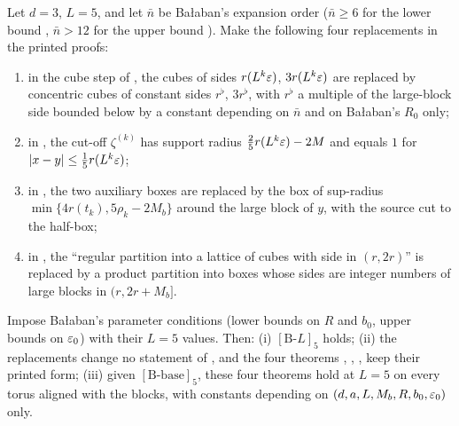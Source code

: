 \begin{theorem}\label{thm:a06:BALA}
Let $d=3$, $L=5$, and let $\bar n$ be Ba{\l}aban's expansion order ($\bar n\ge6$ for the lower bound \cite[p.~605]{Ba1}, $\bar n>12$ for the upper bound \cite[p.~563]{Ba2}). Make the following four replacements in the printed proofs:
\begin{enumerate}[label=\textup{(\alph*)},nosep,leftmargin=*]
\item in the cube step of \cite[p.~433]{Ba3}, the cubes of sides $r(L^k\varepsilon)$, $3r(L^k\varepsilon)$ are replaced by concentric cubes of constant sides $r^\flat$, $3r^\flat$, with $r^\flat$ a multiple of the large-block side bounded below by a constant depending on $\bar n$ and on Ba{\l}aban's $R_0$ only;
\item in \cite[(2.44), p.~566]{Ba2}, the cut-off $\zeta^{(k)}$ has support radius $\frac25r(L^k\varepsilon)-2M$ and equals $1$ for $|x-y|\le\frac15r(L^k\varepsilon)$;
\item in \cite[Lemma~2.4, p.~572]{Ba2}, the two auxiliary boxes are replaced by the box of sup-radius $\min\{4r(t_k),5\rho_k-2M_b\}$ around the large block of $y$, with the source cut to the half-box;
\item in \cite[(3.43)--(3.45), p.~592]{Ba2}, the ``regular partition into a lattice of cubes with side in $(r,2r)$'' is replaced by a product partition into boxes whose sides are integer numbers of large blocks in $(r,2r+M_b]$.
\end{enumerate}
Impose Ba{\l}aban's parameter conditions (lower bounds on $R$ and $b_0$, upper bounds on $\varepsilon_0$) with their $L=5$ values. Then: \textup{(i)} $[\mathrm B\text{-}L]_5$ holds; \textup{(ii)} the replacements change no statement of \cite{Ba1,Ba2,Ba3}, and the four theorems \cite[(1.14)]{Ba1}, \cite[(1.3)]{Ba2}, \cite[Prop.~1]{Ba3}, \cite[Thm.~3.1]{K1} keep their printed form; \textup{(iii)} given $[\mathrm B\text{-base}]_5$, these four theorems hold at $L=5$ on every torus aligned with the blocks, with constants depending on $(d,a,L,M_b,R,b_0,\varepsilon_0)$ only.
\end{theorem}

